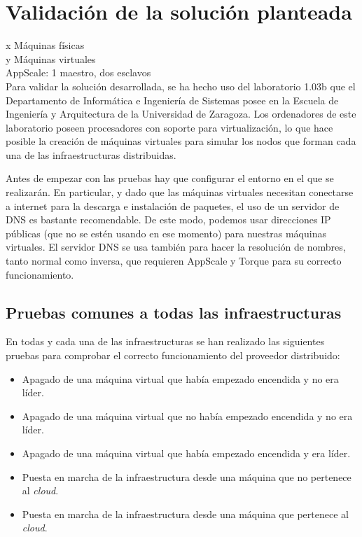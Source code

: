 \chapter{Validación de la solución planteada}
\label{cap:validacion}

x Máquinas físicas\\
y Máquinas virtuales\\
AppScale: 1 maestro, dos esclavos\\


Para validar la solución desarrollada, se ha hecho uso del laboratorio 1.03b que el Departamento de Informática e Ingeniería de Sistemas posee en la Escuela de Ingeniería y Arquitectura de la Universidad de Zaragoza. Los ordenadores de este laboratorio poseen procesadores con soporte para virtualización, lo que hace posible la creación de máquinas virtuales para simular los nodos que forman cada una de las infraestructuras distribuidas.

Antes de empezar con las pruebas hay que configurar el entorno en el que se realizarán. En particular, y dado que las máquinas virtuales necesitan conectarse a internet para la descarga e instalación de paquetes, el uso de un servidor de DNS es bastante recomendable. De este modo, podemos usar direcciones IP públicas (que no se estén usando en ese momento) para nuestras máquinas virtuales. El servidor DNS se usa también para hacer la resolución de nombres, tanto normal como inversa, que requieren AppScale y Torque para su correcto funcionamiento.


\section{Pruebas comunes a todas las infraestructuras}

En todas y cada una de las infraestructuras se han realizado las siguientes pruebas para comprobar el correcto funcionamiento del proveedor distribuido:

\begin{itemize}
\item Apagado de una máquina virtual que había empezado encendida y no era líder.
\item Apagado de una máquina virtual que no había empezado encendida y no era líder.
\item Apagado de una máquina virtual que había empezado encendida y era líder.
\item Puesta en marcha de la infraestructura desde una máquina que no pertenece al \emph{cloud}.
\item Puesta en marcha de la infraestructura desde una máquina que pertenece al \emph{cloud}.
\end{itemize}


